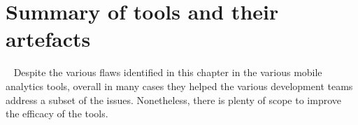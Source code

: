 
\section{Summary of tools and their artefacts}~\label{tata-summary-section}
Despite the various flaws identified in this chapter in the various mobile analytics tools, overall in many cases they helped the various development teams address a subset of the issues. Nonetheless, there is plenty of scope to improve the efficacy of the tools.
